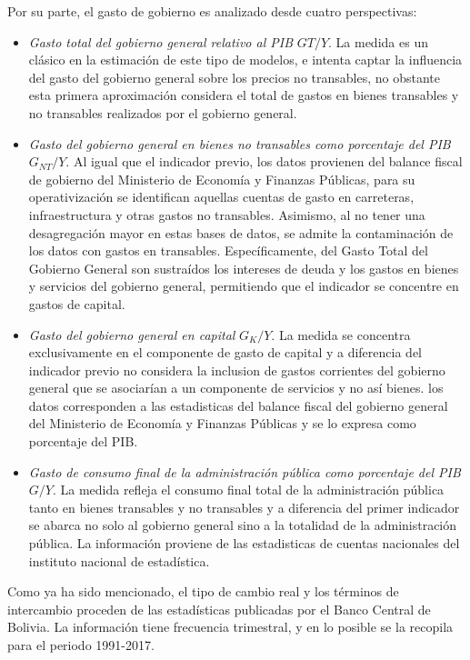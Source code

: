 \documentclass[12pt,letterpaper]{article}
\begin{document}
Por su parte, el gasto de gobierno es analizado desde cuatro perspectivas: 
\begin{itemize}
\item \emph{Gasto total del gobierno general relativo al PIB} $G{T}/Y$. La medida es un clásico en la estimación de este tipo de modelos, e intenta captar la influencia del gasto del gobierno general sobre los precios no transables, no obstante esta primera aproximación considera el total de gastos en bienes transables y no transables realizados por el gobierno general. 
\item \emph{Gasto del gobierno general en bienes no transables como porcentaje del PIB} $G_{NT}/Y$. Al igual que el indicador previo, los datos provienen del balance fiscal de gobierno del Ministerio de Economía y Finanzas  Públicas, para su operativización se identifican aquellas cuentas de gasto en carreteras, infraestructura y otras gastos no transables. Asimismo, al no tener una desagregación mayor en estas bases de datos, se admite la contaminación de los datos con gastos en transables. Específicamente, del Gasto Total del  Gobierno General son sustraídos los intereses de deuda y los gastos en bienes y servicios del gobierno general, permitiendo que el indicador se concentre en gastos de capital.
\item \emph{Gasto del gobierno general en capital} $G_{K}/Y$. La medida se concentra exclusivamente en el componente de gasto de capital y a diferencia del indicador previo no considera la inclusion de gastos corrientes del gobierno general que se asociarían a un componente de servicios y no así bienes. los datos corresponden a las estadisticas del balance fiscal del gobierno general del Ministerio de Economía y Finanzas Públicas y se lo expresa como porcentaje del PIB. 
\item \emph{Gasto de consumo final de la administración pública como porcentaje del PIB} $G/Y$. La medida refleja el consumo final total de la administración pública tanto en bienes transables y no transables y a diferencia del primer indicador se abarca no solo al gobierno general sino a la totalidad de la administración pública. La información proviene de las estadisticas de cuentas nacionales del instituto nacional de estadística.  
\end{itemize}

Como ya ha sido mencionado, el tipo de cambio real y los términos de intercambio proceden de las estadísticas publicadas por el Banco Central de Bolivia. La información tiene frecuencia trimestral, y en lo posible se la recopila para el periodo 1991-2017. 
\end{document}
